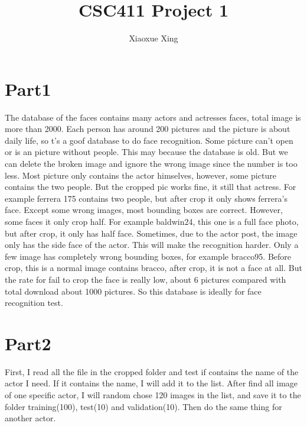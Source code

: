 \documentclass[12pt]{article}
\begin{document}
 
 
 
\title{CSC411 Project 1}%
\author{Xiaoxue Xing\\ %
} %
 
\maketitle


\maketitle
\section{Part1}
The database of the faces contains  many actors and actresses faces, total image is more than 2000. Each person has around 200 pictures and the picture is about daily life, so t’s a goof database to do face recognition.  Some picture can’t open or is an picture without people. This may because the database is old. But we can delete the broken image and  ignore the wrong image since the number is too less. Most picture only contains the actor himselves, however, some picture contains the two people. But the cropped pic works fine, it still that actress. For example ferrera 175 contains two people, but after crop it only shows ferrera’s face. Except some wrong images, most bounding boxes are correct. However, some faces it only crop half. For example baldwin24, this one is a full face photo, but after crop, it only has half face. Sometimes, due to the actor post, the image only has the side face of the actor. This will make the recognition harder. Only a few image has completely wrong bounding boxes, for example bracco95. Before crop, this is a normal image contains bracco, after crop, it is not a face at all. But the rate for fail to crop the face is really low, about 6 pictures compared with total download about 1000 pictures. So this database is ideally for face recognition test.

\section{Part2}
First, I read all the file in the cropped folder and test if contains the name of the actor I need. If it contains the name, I will add it to the list. After find all image of one specific actor, I will random chose 120 images in the list, and save it to the folder  training(100), test(10) and validation(10). Then do the same thing for another actor.
\end{document}
